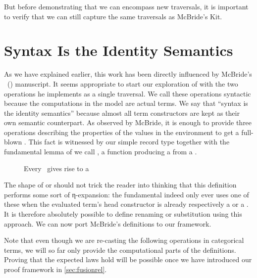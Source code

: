 But before demonstrating that we can encompass new traversals, it is important
to verify that we can still capture the same traversals as McBride's Kit.

\section{Syntax Is the Identity Semantics}
\label{sec:syntactic}

As we have explained earlier, this work has been directly influenced by
McBride's ~(\citeyear{mcbride2005type}) manuscript. It seems appropriate
to start our exploration of  with the two operations he
implements as a single traversal. We call these operations syntactic
because the computations in the model are actual terms. We say that ``syntax
is the identity semantics'' because almost all term constructors are kept
as their own semantic counterpart. As observed by
McBride, it is enough to provide three operations describing the properties
of the values in the environment to get a full-blown . This
fact is witnessed by our simple  record type together with
the fundamental lemma of  we call , a function
producing a  from a .

\begin{figure}[h]
\caption{Every ~gives rise to a \label{fig:syntactic}}
\end{figure}

The shape of  or  should not trick the reader
into thinking that this definition performs some sort of η-expansion:
the fundamental  indeed only ever uses one of these when the
evaluated term's head constructor is already respectively a 
or a . It is therefore absolutely possible to define renaming
or substitution using this approach. We can now port McBride's definitions
to our framework.

\begin{remark}
Note that even though we are re-casting the following operations in
categorical terms, we will so far only provide the computational parts
of the definitions. Proving that the expected laws hold will be possible
once we have introduced our proof framework in \cref{sec:fusionrel}.
\end{remark}

